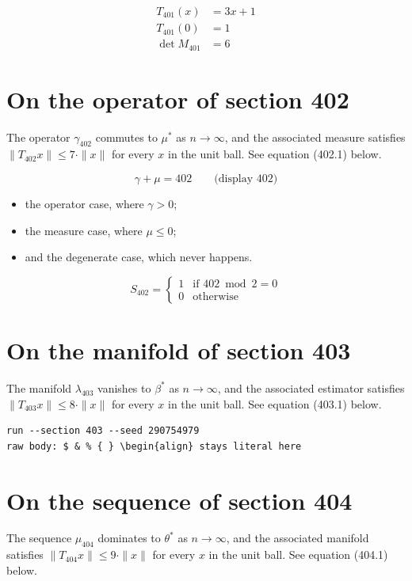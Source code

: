 \documentclass{article}
\begin{document}
\begin{align}
T_{401}(x) &= 3 x + 1 \\
T_{401}(0) &= 1 \\
\det M_{401} &= 6
\end{align}

\section{On the operator of section 402}
The operator $\gamma_{402}$ commutes to $\mu^{*}$ as $n \to \infty$,
and the associated measure satisfies $\|T_{402} x\| \leq 7 \cdot \|x\|$
for every $x$ in the unit ball. See equation (402.1) below.

$$
\gamma + \mu = 402 \qquad \text{(display 402)}
$$

\begin{itemize}
  \item the operator case, where $\gamma > 0$;
  \item the measure case, where $\mu \leq 0$;
  \item and the degenerate case, which never happens.
\end{itemize}

\begin{equation}
S_{402} = \begin{cases} 1 & \text{if } 402 \bmod 2 = 0 \\ 0 & \text{otherwise} \end{cases}
\end{equation}

\section{On the manifold of section 403}
The manifold $\lambda_{403}$ vanishes to $\beta^{*}$ as $n \to \infty$,
and the associated estimator satisfies $\|T_{403} x\| \leq 8 \cdot \|x\|$
for every $x$ in the unit ball. See equation (403.1) below.

\begin{verbatim}
run --section 403 --seed 290754979
raw body: $ & % { } \begin{align} stays literal here
\end{verbatim}

\section{On the sequence of section 404}
The sequence $\mu_{404}$ dominates to $\theta^{*}$ as $n \to \infty$,
and the associated manifold satisfies $\|T_{404} x\| \leq 9 \cdot \|x\|$
for every $x$ in the unit ball. See equation (404.1) below.
\end{document}
